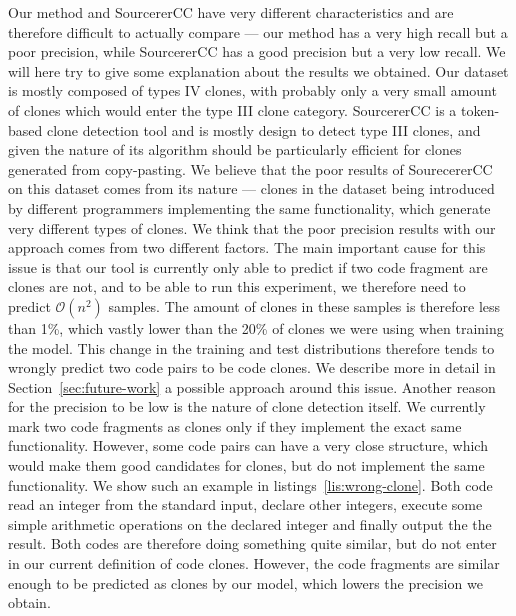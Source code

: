 Our method and SourcererCC have very different characteristics and are therefore
difficult to actually compare --- our method has a very high recall but a poor
precision, while SourcererCC has a good precision but a very low recall. We will
here try to give some explanation about the results we obtained. Our dataset is
mostly composed of types IV clones, with probably only a very small amount of
clones which would enter the type III clone category. SourcererCC is a
token-based clone detection tool and is mostly design to detect type III clones,
and given the nature of its algorithm should be particularly efficient for
clones generated from copy-pasting. We believe that the poor results of
SourecererCC on this dataset comes from its nature --- clones in the dataset
being introduced by different programmers implementing the same functionality,
which generate very different types of clones. We think that the poor precision
results with our approach comes from two different factors. The main important
cause for this issue is that our tool is currently only able to predict if two
code fragment are clones are not, and to be able to run this experiment, we
therefore need to predict $\mathcal{O}\left( n^2 \right)$ samples. The amount of
clones in these samples is therefore less than 1\%, which vastly lower than the
20\% of clones we were using when training the model. This change in the
training and test distributions therefore tends to wrongly predict two code
pairs to be code clones. We describe more in detail in
Section~\ref{sec:future-work} a possible approach around this issue. Another
reason for the precision to be low is the nature of clone detection itself. We
currently mark two code fragments as clones only if they implement the exact
same functionality. However, some code pairs can have a very close structure,
which would make them good candidates for clones, but do not implement the same
functionality. We show such an example in listings~\ref{lis:wrong-clone}. Both
code read an integer from the standard input, declare other integers, execute
some simple arithmetic operations on the declared integer and finally output the
the result. Both codes are therefore doing something quite similar, but do not
enter in our current definition of code clones. However, the code fragments are
similar enough to be predicted as clones by our model, which lowers the
precision we obtain.
\begin{figure}
  
  
\end{figure}
